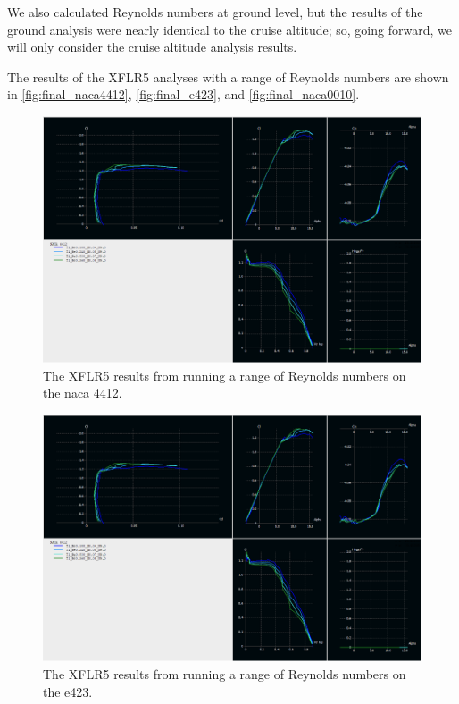 We also calculated Reynolds numbers at ground level, but the results of the ground analysis were nearly identical to the cruise altitude; so, going forward, we will only consider the cruise altitude analysis results.

The results of the XFLR5 analyses with a range of Reynolds numbers are shown in \autoref{fig:final_naca4412}, \autoref{fig:final_e423}, and \autoref{fig:final_naca0010}.

\begin{figure}[htpb]
    \centering
    \includegraphics[width=\linewidth]{Figures/final_naca_4412.png}
    \caption[Final XFLR5 analysis of \acrshort{naca} 4412]{The XFLR5 results from running a range of Reynolds numbers on the \acrshort{naca} 4412.}
    \label{fig:final_naca4412}
\end{figure}

\begin{figure}[htpb]
    \centering
    \includegraphics[width=\linewidth]{Figures/final_naca_4412.png}
    \caption[Final XFLR5 analysis of \acrshort{e}423]{The XFLR5 results from running a range of Reynolds numbers on the \acrshort{e}423.}
    \label{fig:final_e423}
\end{figure}

